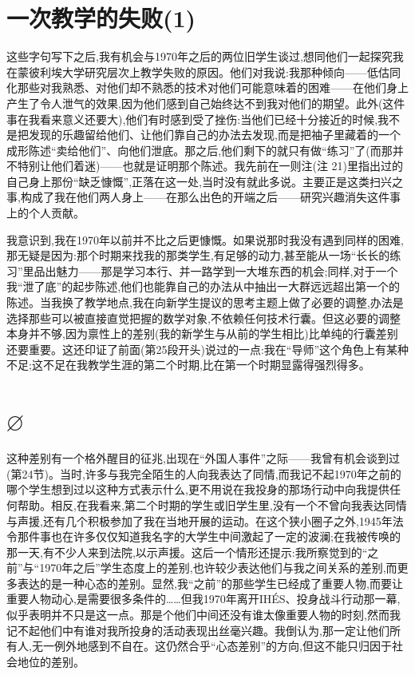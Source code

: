 \section{一次教学的失败(1)}

这些字句写下之后,我有机会与1970年之后的两位旧学生谈过,想同他们一起探究我在蒙彼利埃大学研究层次上教学失败的原因。他们对我说:我那种倾向——低估同化那些对我熟悉、对他们却不熟悉的技术对他们可能意味着的困难——在他们身上产生了令人泄气的效果,因为他们感到自己始终达不到我对他们的期望。此外(这件事在我看来意义还要大),他们有时感到受了挫伤:当他们已经十分接近的时候,我不是把发现的乐趣留给他们、让他们靠自己的办法去发现,而是把袖子里藏着的一个成形陈述“卖给他们”、向他们泄底。那之后,他们剩下的就只有做“练习”了(而那并不特别让他们着迷)——也就是证明那个陈述。我先前在一则注(注 21)里指出过的自己身上那份“缺乏慷慨”,正落在这一处,当时没有就此多说。主要正是这类扫兴之事,构成了我在他们两人身上——在那么出色的开端之后——研究兴趣消失这件事上的个人贡献。

我意识到,我在1970年以前并不比之后更慷慨。如果说那时我没有遇到同样的困难,那无疑是因为:那个时期来找我的那类学生,有足够的动力,甚至能从一场“长长的练习”里品出魅力——那是学习本行、并一路学到一大堆东西的机会;同样,对于一个我“泄了底”的起步陈述,他们也能靠自己的办法从中抽出一大群远远超出第一个的陈述。当我换了教学地点,我在向新学生提议的思考主题上做了必要的调整,办法是选择那些可以被直接直觉把握的数学对象,不依赖任何技术行囊。但这必要的调整本身并不够,因为禀性上的差别(我的新学生与从前的学生相比)比单纯的行囊差别还要重要。这还印证了前面(第25段开头)说过的一点:我在“导师”这个角色上有某种不足;这不足在我教学生涯的第二个时期,比在第一个时期显露得强烈得多。

\section{$\varnothing$}

这种差别有一个格外醒目的征兆,出现在“外国人事件”之际——我曾有机会谈到过(第24节)。当时,许多与我完全陌生的人向我表达了同情,而我记不起1970年之前的哪个学生想到过以这种方式表示什么,更不用说在我投身的那场行动中向我提供任何帮助。相反,在我看来,第二个时期的学生或旧学生里,没有一个不曾向我表达同情与声援,还有几个积极参加了我在当地开展的运动。在这个狭小圈子之外,1945年法令那件事也在许多仅仅知道我名字的大学生中间激起了一定的波澜;在我被传唤的那一天,有不少人来到法院,以示声援。这后一个情形还提示:我所察觉到的“之前”与“1970年之后”学生态度上的差别,也许较少表达他们与我之间关系的差别,而更多表达的是一种心态的差别。显然,我“之前”的那些学生已经成了重要人物,而要让重要人物动心,是需要很多条件的……但我1970年离开IHÉS、投身战斗行动那一幕,似乎表明并不只是这一点。那是个他们中间还没有谁太像重要人物的时刻,然而我记不起他们中有谁对我所投身的活动表现出丝毫兴趣。我倒认为,那一定让他们所有人,无一例外地感到不自在。这仍然合乎“心态差别”的方向,但这不能只归因于社会地位的差别。

